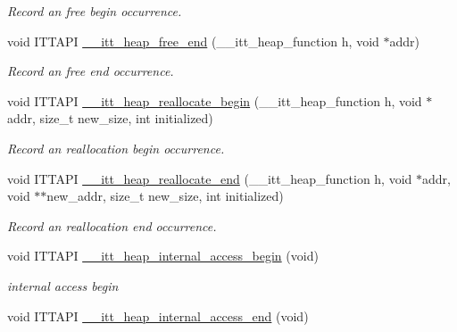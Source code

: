 \begin{DoxyCompactItemize}
\begin{DoxyCompactList}\small\item\em Record an free begin occurrence. \end{DoxyCompactList}\item 
\hypertarget{group__heap_gaf7f76cc500828981b9b785292a974c0b}{}void I\+T\+T\+A\+P\+I \hyperlink{group__heap_gaf7f76cc500828981b9b785292a974c0b}{\+\_\+\+\_\+itt\+\_\+heap\+\_\+free\+\_\+end} (\+\_\+\+\_\+itt\+\_\+heap\+\_\+function h, void $\ast$addr)\label{group__heap_gaf7f76cc500828981b9b785292a974c0b}

\begin{DoxyCompactList}\small\item\em Record an free end occurrence. \end{DoxyCompactList}\item 
\hypertarget{group__heap_gae25ce7c1240c935198ce4652ae8048fd}{}void I\+T\+T\+A\+P\+I \hyperlink{group__heap_gae25ce7c1240c935198ce4652ae8048fd}{\+\_\+\+\_\+itt\+\_\+heap\+\_\+reallocate\+\_\+begin} (\+\_\+\+\_\+itt\+\_\+heap\+\_\+function h, void $\ast$addr, size\+\_\+t new\+\_\+size, int initialized)\label{group__heap_gae25ce7c1240c935198ce4652ae8048fd}

\begin{DoxyCompactList}\small\item\em Record an reallocation begin occurrence. \end{DoxyCompactList}\item 
\hypertarget{group__heap_gaf9533c88db849c2e7e898083b2eb40c7}{}void I\+T\+T\+A\+P\+I \hyperlink{group__heap_gaf9533c88db849c2e7e898083b2eb40c7}{\+\_\+\+\_\+itt\+\_\+heap\+\_\+reallocate\+\_\+end} (\+\_\+\+\_\+itt\+\_\+heap\+\_\+function h, void $\ast$addr, void $\ast$$\ast$new\+\_\+addr, size\+\_\+t new\+\_\+size, int initialized)\label{group__heap_gaf9533c88db849c2e7e898083b2eb40c7}

\begin{DoxyCompactList}\small\item\em Record an reallocation end occurrence. \end{DoxyCompactList}\item 
\hypertarget{group__heap_gac199e6db97784bf770736cb2ecbe39fe}{}void I\+T\+T\+A\+P\+I \hyperlink{group__heap_gac199e6db97784bf770736cb2ecbe39fe}{\+\_\+\+\_\+itt\+\_\+heap\+\_\+internal\+\_\+access\+\_\+begin} (void)\label{group__heap_gac199e6db97784bf770736cb2ecbe39fe}

\begin{DoxyCompactList}\small\item\em internal access begin \end{DoxyCompactList}\item 
\hypertarget{group__heap_ga2e8dbae7f1fb1c93cc50b4549e2ec91f}{}void I\+T\+T\+A\+P\+I \hyperlink{group__heap_ga2e8dbae7f1fb1c93cc50b4549e2ec91f}{\+\_\+\+\_\+itt\+\_\+heap\+\_\+internal\+\_\+access\+\_\+end} (void)\label{group__heap_ga2e8dbae7f1fb1c93cc50b4549e2ec91f}


\end{DoxyCompactItemize}
